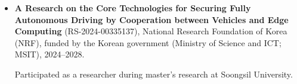 \documentclass[a4paper,12pt]{article}
\begin{document}
\begin{itemize}[leftmargin=*,labelsep=1mm,label={}]

  \item \textbf{A Research on the Core Technologies for Securing Fully Autonomous Driving by Cooperation between Vehicles and Edge Computing} (RS-2024-00335137), National Research Foundation of Korea (NRF), funded by the Korean government (Ministry of Science and ICT; MSIT), 2024--2028.
  
  Participated as a researcher during master's research at Soongsil University.

\end{itemize}
\end{document}

